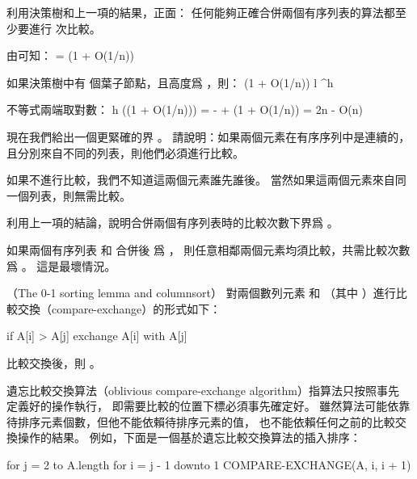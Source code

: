 \startANSWER
\startformula
{}
\stopformula
\stopANSWER

\startitem
利用決策樹和上一項的結果，正面：
任何能夠正確合併兩個有序列表的算法都至少要進行  次比較。
\stopitem

\startANSWER
由\inexercise[c_2n_n] 可知：
\startformula
{} = (1 + O(1/n))
\stopformula

如果決策樹中有  個葉子節點，且高度爲 ，則：
\startformula
{}(1 + O(1/n)) \le l ^h
\stopformula

不等式兩端取對數：
\startformula\startmathalignment
\NC h \NC \ge \lg\left((1 + O(1/n))\right) \NR
\NC   \NC =  - \lg{} + \lg(1 + O(1/n)) \NR
\NC   \NC = 2n - O(n) \NR
\stopmathalignment\stopformula
\stopANSWER
\stopigBase

現在我們給出一個更緊確的界 。
\startigBase[a,continue]
\startitem
請說明：如果兩個元素在有序序列中是連續的，且分別來自不同的列表，則他們必須進行比較。
\stopitem

\startANSWER
如果不進行比較，我們不知道這兩個元素誰先誰後。
當然如果這兩個元素來自同一個列表，則無需比較。
\stopANSWER

\startitem
利用上一項的結論，說明合併兩個有序列表時的比較次數下界爲 。
\stopitem

\startANSWER
如果兩個有序列表  和  合併後
爲 ，
則任意相鄰兩個元素均須比較，共需比較次數爲 。
這是最壞情況。
\stopANSWER
\stopigBase
\stopPROBLEM

\startPROBLEM
（The 0-1 sorting lemma and columnsort）
對兩個數列元素  和  （其中 ）進行{\EMP 比較交換}（{\EMP compare-exchange}）的形式如下：

\startCLRS
if A[i] > A[j]
	exchange A[i] with A[j]
\stopCLRS

比較交換後，則 。

{\EMP 遺忘比較交換算法（oblivious compare-exchange algorithm）}指算法只按照事先
定義好的操作執行，
即需要比較的位置下標必須事先確定好。
雖然算法可能依靠待排序元素個數，但他不能依賴待排序元素的值，
也不能依賴任何之前的比較交換操作的結果。
例如，下面是一個基於遺忘比較交換算法的插入排序：

\startCLRS
for j = 2 to A.length
	for i = j - 1 downto 1
		COMPARE-EXCHANGE(A, i, i + 1)
\stopCLRS

